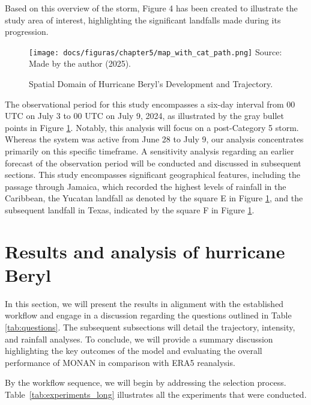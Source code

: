 Based on this overview of the storm, Figure 4 has been created to illustrate the study area of interest, highlighting the significant landfalls made during its progression.

\begin{figure}[h!]
	\centering
	\caption{Spatial Domain of Hurricane Beryl's Development and Trajectory.}
	\label{fig:spatialdomainberyl}\texttt{[image: docs/figuras/chapter5/map\_with\_cat\_path.png]}
	\centering
	Source: Made by the author (2025).
\end{figure}

The observational period for this study encompasses a six-day interval from 00 UTC on July 3 to 00 UTC on July 9, 2024, as illustrated by the gray bullet points in Figure \ref{fig:spatialdomainberyl}. Notably, this analysis will focus on a post-Category 5 storm. Whereas the system was active from June 28 to July 9, our analysis concentrates primarily on this specific timeframe. A sensitivity analysis regarding an earlier forecast of the observation period will be conducted and discussed in subsequent sections. This study encompasses significant geographical features, including the passage through Jamaica, which recorded the highest levels of rainfall in the Caribbean, the Yucatan landfall as denoted by the square E in Figure \ref{fig:spatialdomainberyl}, and the subsequent landfall in Texas, indicated by the square F in Figure \ref{fig:spatialdomainberyl}.


\section{Results and analysis of hurricane Beryl}

In this section, we will present the results in alignment with the established workflow and engage in a discussion regarding the questions outlined in Table \ref{tab:questions}. The subsequent subsections will detail the trajectory, intensity, and rainfall analyses. To conclude, we will provide a summary discussion highlighting the key outcomes of the model and evaluating the overall performance of MONAN in comparison with ERA5 reanalysis.

By the workflow sequence, we will begin by addressing the selection process. Table~\ref{tab:experiments_long} illustrates all the experiments that were conducted.

